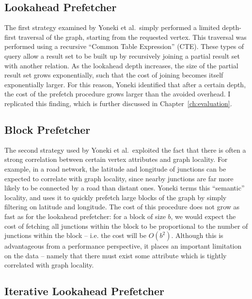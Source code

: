 \subsection{Lookahead Prefetcher}

The first strategy examined by Yoneki et al.~simply performed a limited depth-first
traversal of the graph, starting from the requested vertex. This traversal was
performed using a recursive ``Common Table Expression'' (CTE). These types of
query allow a result set to be built up by recursively joining a partial
result set with another relation. As the lookahead depth increases, the size
of the partial result set grows exponentially, such that the cost of joining
becomes itself exponentially larger. For this reason, Yoneki identified that
after a certain depth, the cost of the prefetch procedure grows larger than
the avoided overhead. I replicated this finding, which is further discussed in
Chapter~\ref{ch:evaluation}.



\subsection{Block Prefetcher}

The second strategy used by Yoneki et al.~exploited the fact that there is
often a strong correlation between certain vertex attributes and graph locality. For
example, in a road network, the latitude and longitude of junctions can be
expected to correlate with graph locality, since nearby junctions are far more
likely to be connected by a road than distant ones. Yoneki terms this
``semantic'' locality, and uses it to quickly prefetch large blocks of the
graph by simply filtering on latitude and longitude. The cost of this
procedure does not grow as fast as for the lookahead prefetcher: for a block
of size $b$,  we would expect the cost of fetching all junctions within the
block to be proportional to the number of junctions within the block -- i.e.
the cost will be $O(b^2)$. Although this is advantageous from a performance
perspective, it places an important limitation on the data -- namely that
there must exist some attribute which is tightly correlated with graph
locality.



\subsection{Iterative Lookahead Prefetcher}

